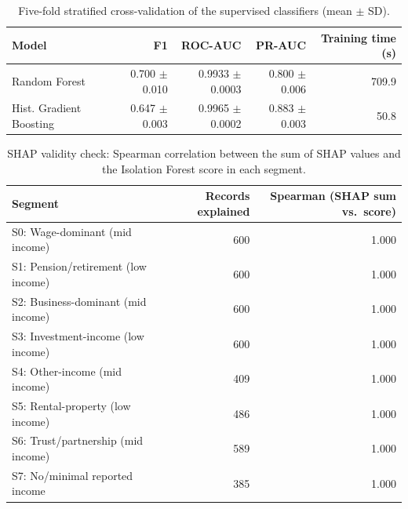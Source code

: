 \begin{table}[H]
    \centering
    \caption{Five-fold stratified cross-validation of the supervised classifiers (mean $\pm$ SD).}
    \label{tab:app_cv}
    \footnotesize
    \begin{tabular}{lrrrr}
        \toprule
        Model & F1 & ROC-AUC & PR-AUC & Training time (s) \\
        \midrule
        Random Forest & 0.700 $\pm$ 0.010 & 0.9933 $\pm$ 0.0003 & 0.800 $\pm$ 0.006 & 709.9 \\
        Hist. Gradient Boosting & 0.647 $\pm$ 0.003 & 0.9965 $\pm$ 0.0002 & 0.883 $\pm$ 0.003 & 50.8 \\
        \bottomrule
    \end{tabular}
\end{table}

\begin{table}[H]
    \centering
    \caption{SHAP validity check: Spearman correlation between the sum of SHAP values and the Isolation Forest score in each segment.}
    \label{tab:app_shap_validity}
    \footnotesize
    \begin{tabular}{lrr}
        \toprule
        Segment & Records explained & Spearman (SHAP sum vs.\ score) \\
        \midrule
        S0: Wage-dominant (mid income) & 600 & 1.000 \\
        S1: Pension/retirement (low income) & 600 & 1.000 \\
        S2: Business-dominant (mid income) & 600 & 1.000 \\
        S3: Investment-income (low income) & 600 & 1.000 \\
        S4: Other-income (mid income) & 409 & 1.000 \\
        S5: Rental-property (low income) & 486 & 1.000 \\
        S6: Trust/partnership (mid income) & 589 & 1.000 \\
        S7: No/minimal reported income & 385 & 1.000 \\
        \bottomrule
    \end{tabular}
\end{table}

